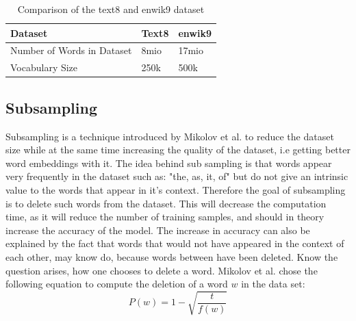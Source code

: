 \begin{table}[]
\centering
\begin{tabular}{|l|l|l|}
\hline
Dataset                    & Text8 & enwik9 \\ \hline
Number of Words in Dataset & 8mio  & 17mio  \\ \hline
Vocabulary Size            & 250k  & 500k   \\ \hline
\end{tabular}
\caption{Comparison of the text8 and enwik9 dataset}
    \label{table:t8_e9_comp}
\end{table}
 
 
\subsection{Subsampling}
Subsampling is a technique introduced by Mikolov et al. \cite{mikolov} to reduce the dataset size while at the same time increasing the quality of the dataset, i.e getting better word embeddings with it. The idea behind sub sampling is that words appear very frequently in the dataset such as: "the, as, it, of" but do not give an intrinsic value to the words that appear in it's context. Therefore the goal of subsampling is to delete such words from the dataset. This will decrease the computation time, as it will reduce the number of training samples, and should in theory increase the accuracy of the model. The increase in accuracy can also be explained by the fact that words that would not have appeared in the context of each other, may know do, because words between have been deleted.
Know the question arises, how one chooses to delete a word. Mikolov et al. chose the following equation to compute the deletion of a word $w$ in the data set:
\begin{equation} \label{eq:sampling}
P(w) = 1- \sqrt{{\frac{t}{f(w)}}}
\end{equation}

